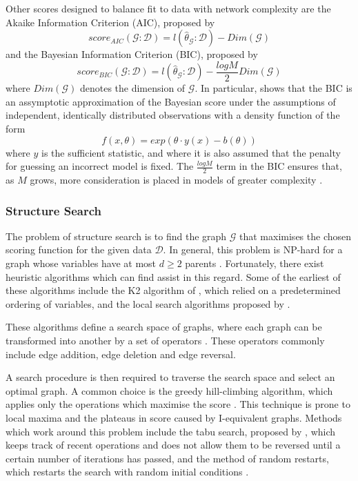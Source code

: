 \documentclass [11pt]{article}
\begin{document}
Other scores designed to balance fit to data with network complexity are the Akaike Information Criterion (AIC), proposed by \citet{akaike98}
\begin{equation*}
score_{AIC}(\mathcal{G}:\mathcal{D}) = l(\hat{\theta}_{\mathcal{G}}:\mathcal{D}) - Dim(\mathcal{G})
\end{equation*}
and the Bayesian Information Criterion (BIC), proposed by \citet{schwarz78}
\begin{equation*}
score_{BIC}(\mathcal{G}:\mathcal{D}) = l(\hat{\theta}_{\mathcal{G}}:\mathcal{D}) - \frac{logM}{2}Dim(\mathcal{G})
\end{equation*}
where $Dim(\mathcal{G})$ denotes the dimension of $\mathcal{G}$. In particular, \citet{schwarz78} shows that the BIC is an assymptotic approximation of the Bayesian score under the assumptions of independent, identically distributed observations with a density function of the form
\begin{equation*}
f(x,\theta) = exp(\theta \cdot y(x) - b(\theta))
\end{equation*}
where $y$ is the sufficient statistic, and where it is also assumed that the penalty for guessing an incorrect model is fixed. The $\frac{logM}{2}$ term in the BIC ensures that, as $M$ grows, more consideration is placed in models of greater complexity \citep{koller09}.
\subsubsection{Structure Search}\label{StructureSearch}
The problem of structure search is to find the graph $\mathcal{G}$ that maximises the chosen scoring function for the given data $\mathcal{D}$. In general, this problem is NP-hard for a graph whose variables have at most $d\geq 2$ parents \citep{chickering96}. Fortunately, there exist heuristic algorithms which can find assist in this regard. Some of the earliest of these algorithms include the K2 algorithm of \citet{cooper92}, which relied on a predetermined ordering of variables, and the local search algorithms proposed by \citet{heckerman95}.

These algorithms define a search space of graphs, where each graph can be transformed into another by a set of operators \citep{koller09}. These operators commonly include edge addition, edge deletion and edge reversal. 

A search procedure is then required to traverse the search space and select an optimal graph. A common choice is the greedy hill-climbing algorithm, which applies only the operations which maximise the score \citep{koller09}. This technique is prone to local maxima and the plateaus in score caused by I-equivalent graphs. Methods which work around this problem include the tabu search, proposed by \citet{glover86}, which keeps track of recent operations and does not allow them to be reversed until a certain number of iterations has passed, and the method of random restarts, which restarts the search with random initial conditions \citep{koller09}.
\end{document}
